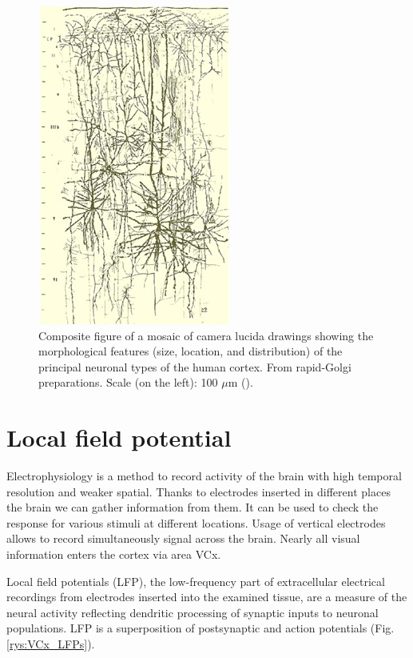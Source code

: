 \documentclass{pracalicmgr}
\begin{document}
        \begin{figure}[H]
        	\begin{center}
        		\includegraphics[scale=1]{morphology_neurons.png}
        	\end{center}
        	\caption{Composite figure of a mosaic of camera lucida drawings showing the morphological features (size, location, and distribution) of the principal neuronal types of the human cortex. From rapid-Golgi preparations. Scale (on the left): 100 $\mu$m  (\cite{morphology}).}
        	\label{rys:morphology_neurons}
        \end{figure}   
             
        
        \section{Local field potential}
        Electrophysiology is a method to record activity of the brain with high temporal resolution and weaker spatial. Thanks to electrodes inserted in different places the brain we can gather information from them. It can be used to check the response for various stimuli at different locations. Usage of vertical electrodes allows to record simultaneously signal across the brain. Nearly all visual information enters the cortex via area VCx. 
        
        Local field potentials (LFP), the low-frequency part of extracellular electrical
        recordings from electrodes inserted into the examined tissue, are a measure of the neural activity reflecting dendritic
        processing of synaptic inputs to neuronal populations. LFP is a superposition of postsynaptic and action potentials  (Fig. \ref{rys:VCx_LFPs}).
     
\end{document}
